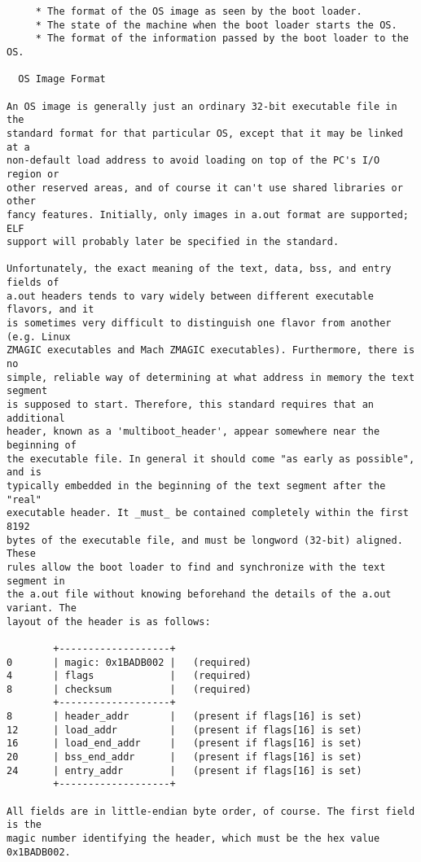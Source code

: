 \begin{verbatim}
     * The format of the OS image as seen by the boot loader.
     * The state of the machine when the boot loader starts the OS.
     * The format of the information passed by the boot loader to the OS.
       
  OS Image Format
  
An OS image is generally just an ordinary 32-bit executable file in the
standard format for that particular OS, except that it may be linked at a
non-default load address to avoid loading on top of the PC's I/O region or
other reserved areas, and of course it can't use shared libraries or other
fancy features. Initially, only images in a.out format are supported; ELF
support will probably later be specified in the standard.

Unfortunately, the exact meaning of the text, data, bss, and entry fields of
a.out headers tends to vary widely between different executable flavors, and it
is sometimes very difficult to distinguish one flavor from another (e.g. Linux
ZMAGIC executables and Mach ZMAGIC executables). Furthermore, there is no
simple, reliable way of determining at what address in memory the text segment
is supposed to start. Therefore, this standard requires that an additional
header, known as a 'multiboot_header', appear somewhere near the beginning of
the executable file. In general it should come "as early as possible", and is
typically embedded in the beginning of the text segment after the "real"
executable header. It _must_ be contained completely within the first 8192
bytes of the executable file, and must be longword (32-bit) aligned. These
rules allow the boot loader to find and synchronize with the text segment in
the a.out file without knowing beforehand the details of the a.out variant. The
layout of the header is as follows:

        +-------------------+
0       | magic: 0x1BADB002 |   (required)
4       | flags             |   (required)
8       | checksum          |   (required)
        +-------------------+
8       | header_addr       |   (present if flags[16] is set)
12      | load_addr         |   (present if flags[16] is set)
16      | load_end_addr     |   (present if flags[16] is set)
20      | bss_end_addr      |   (present if flags[16] is set)
24      | entry_addr        |   (present if flags[16] is set)
        +-------------------+

All fields are in little-endian byte order, of course. The first field is the
magic number identifying the header, which must be the hex value 0x1BADB002.


\end{verbatim}
